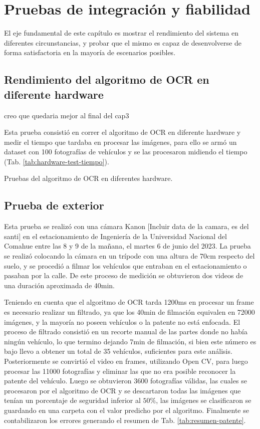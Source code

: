 \chapter{Pruebas de integración y fiabilidad}

El eje fundamental de este capítulo es mostrar el rendimiento del sistema en diferentes circunstancias, y probar que el mismo es capaz de desenvolverse de forma satisfactoria en la mayoría de escenarios posibles.

\section{Rendimiento del algoritmo de OCR en diferente hardware}

 {
  \huge creo que quedaria mejor al final del cap3
 }

Esta prueba consistió en correr el algoritmo de OCR en diferente hardware y medir el tiempo que tardaba en procesar las imágenes, para ello se armó un dataset con 100 fotografías de vehículos y se las procesaron midiendo el tiempo (Tab. \ref{tab:hardware-test-tiempo}).

\begin{table}
    \centering
    \caption{Pruebas del algoritmo de OCR en diferentes hardware.}
    \label{tab:hardware-test-tiempo}
\end{table}

\section{Prueba de exterior}

Esta prueba se realizó con una cámara Kanon [Incluir data de la camara, es del santi] en el estacionamiento de Ingeniería de la Universidad Nacional del Comahue entre las 8 y 9 de la mañana, el martes 6 de junio del 2023. La prueba se realizó colocando la cámara en un trípode con una altura de 70cm respecto del suelo, y se procedió a filmar los vehículos que entraban en el estacionamiento o pasaban por la calle. De este proceso de medición se obtuvieron dos videos de una duración aproximada de 40min.

Teniendo en cuenta que el algoritmo de OCR tarda 1200ms en procesar un frame es necesario realizar un filtrado, ya que los 40min de filmación equivalen en 72000 imágenes, y la mayoría no poseen vehículos o la patente no está enfocada. El proceso de filtrado consistió en un recorte manual de las partes donde no había ningún vehículo, lo que termino dejando 7min de filmación, si bien este número es bajo llevo a obtener un total de 35 vehículos, suficientes para este análisis. Posteriormente se convirtió el video en frames, utilizando Open CV, para luego procesar las 11000 fotografías y eliminar las que no era posible reconocer la patente del vehículo. Luego se obtuvieron 3600 fotografías válidas, las cuales se procesaron por el algoritmo de OCR y se descartaron todas las imágenes que tenían un porcentaje de seguridad inferior al $50\%$, las imágenes se clasificaron se guardando en una carpeta con el valor predicho por el algoritmo.
Finalmente se contabilizaron los errores generando el resumen de Tab. \ref{tab:resumen-patente}.

